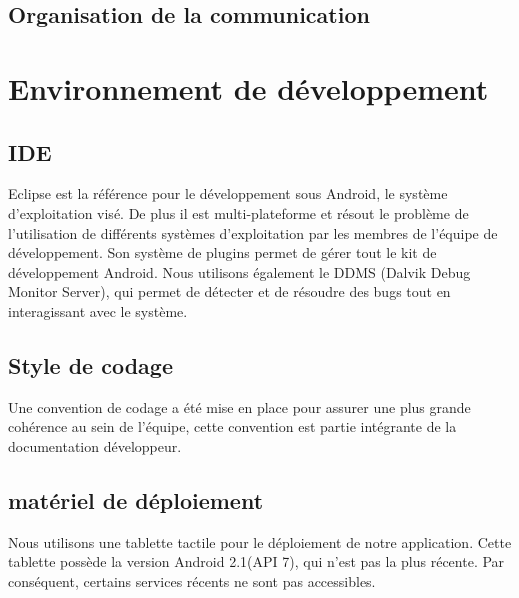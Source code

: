 \subsection{Organisation de la communication}


\section{Environnement de développement}
\subsection{IDE}
Eclipse est la référence pour le développement sous Android, le système d'exploitation visé. De plus il est multi-plateforme et résout le problème de l'utilisation de différents systèmes d'exploitation par les membres de l'équipe de développement.
Son système de plugins permet de gérer tout le kit de développement Android. Nous utilisons également le DDMS (Dalvik Debug Monitor Server), qui permet de détecter et de résoudre des bugs tout en interagissant avec le système. 

\subsection{Style de codage}
Une convention de codage a été mise en place pour assurer une plus grande cohérence au sein de l'équipe, cette convention est partie intégrante de la documentation développeur.

\subsection{matériel de déploiement}
Nous utilisons une tablette tactile pour le déploiement de notre application. Cette tablette possède la version Android 2.1(API 7), qui n'est pas la plus récente. Par conséquent, certains services récents ne sont pas accessibles. 

